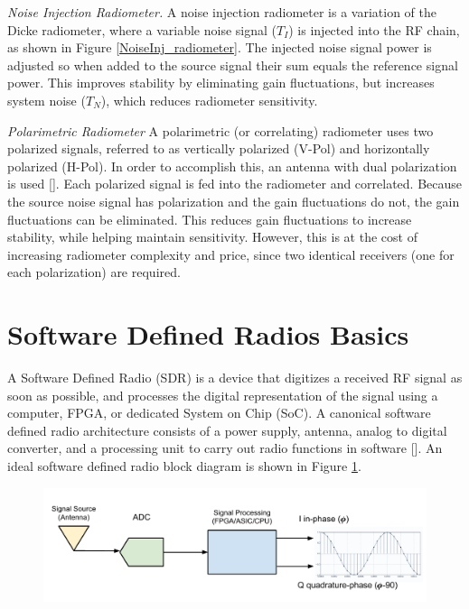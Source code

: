 \emph{Noise Injection Radiometer.}  A noise injection radiometer is a variation of the Dicke radiometer, where a variable noise signal ($T_I$) is injected into the RF chain, as shown in Figure \ref{NoiseInj_radiometer}.  The injected noise signal power is adjusted so when added to the source signal their sum equals the reference signal power.  This improves stability by eliminating gain fluctuations, but increases system noise ($T_N$), which reduces radiometer sensitivity.

\emph{Polarimetric Radiometer} A polarimetric (or correlating) radiometer uses two polarized signals, referred to as vertically polarized (V-Pol) and horizontally polarized (H-Pol).  In order to accomplish this, an antenna with dual polarization is used [\cite{Fujimoto}].  Each polarized signal is fed into the radiometer and correlated.  Because the source noise signal has polarization and the gain fluctuations do not, the gain fluctuations can be eliminated.  This reduces gain fluctuations to increase stability, while helping maintain sensitivity.  However, this is at the cost of increasing radiometer complexity and price, since two identical receivers (one for each polarization) are required. 
 
\section{Software Defined Radios Basics} 
A Software Defined Radio (SDR) is a device that digitizes a received RF signal as soon as possible, and processes the digital representation of the signal using a computer, FPGA, or dedicated System on Chip (SoC).  A canonical software defined radio architecture consists of a power supply, antenna, analog to digital converter, and a processing unit to carry out radio functions in software [\cite{Mitola1995}]. An ideal software defined radio block diagram is shown in Figure \ref{ideal_sdr}.

{\begin{figure}[h!tb] 
\centering
\includegraphics[width=\textwidth]{Images/SDR_Ideal_block.pdf}
\label{ideal_sdr}
\end{figure}
}

